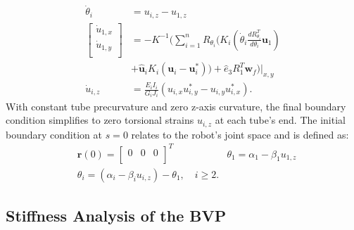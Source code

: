{\begin{align*}
    \dot{\theta}_i &= u_{i, z} - u_{1, z}\\
    \begin{bmatrix}
		\dot{u}_{1, x}\\
		\dot{u}_{1, y}\\
	\end{bmatrix} &= -K^{-1}(\sum^{n}_{i=1} R_{\theta_i}(K_i (\dot{\theta}_i \frac{dR^T_{\theta_i}}{d\theta_i}\boldsymbol{u}_1) \\
    & + \widehat{\boldsymbol{u}}_i K_i (\boldsymbol{u}_i - \boldsymbol{u}^{*}_i)) + \widehat{e}_3 R^T_1 \boldsymbol{w}_f)|_{x, y}\\
    \dot{u}_{i, z} &= \frac{E_iI_i}{G_iJ_i}(u_{i, x}u^{*}_{i, y} - u_{i, y}u^{*}_{i, x})
    .
\end{align*}
With constant tube precurvature and zero z-axis curvature, the final boundary condition simplifies to zero torsional strains $u_{i, z}$ at each tube's end.
The initial boundary condition at $s = 0$ relates to the robot's joint space and is defined as:
\begin{align*}
    & \boldsymbol{r}(0) = \begin{bmatrix}
		0 & 0 & 0\\
	\end{bmatrix}^T & \theta_1 = \alpha_1 - \beta_1 u_{1, z} \\
 & \theta_i = (\alpha_i - \beta_i u_{i, z}) - \theta_1, \quad i \geq 2
 .
\end{align*}
}

\subsection{Stiffness Analysis of the BVP}


